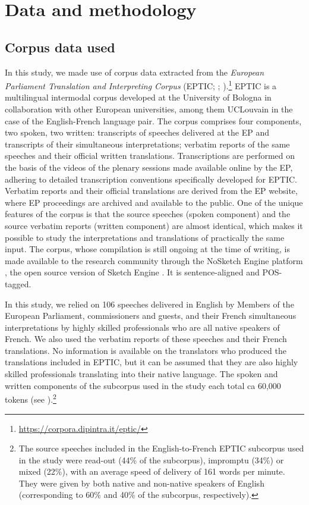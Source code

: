 \documentclass[output=paper]{langscibook}
\begin{document}
\section{Data and methodology}\label{sec:lefer:3}
\subsection{Corpus data used}\label{sec:lefer:3.1}

In this study, we made use of corpus data extracted from the \textit{European Parliament Translation and Interpreting Corpus} (EPTIC; \citealt{BernardiniEtAl2016}; \citealt{FerraresiBernardini2019}).\footnote{\url{https://corpora.dipintra.it/eptic/}} EPTIC is a multilingual intermodal corpus developed at the University of Bologna in collaboration with other European universities, among them UCLouvain in the case of the English-French language pair. The corpus comprises four components, two spoken, two written: transcripts of speeches delivered at the EP and transcripts of their simultaneous interpretations; verbatim reports of the same speeches and their official written translations. Transcriptions are performed on the basis of the videos of the plenary sessions made available online by the EP, adhering to detailed transcription conventions specifically developed for EPTIC. Verbatim reports and their official translations are derived from the EP website, where EP proceedings are archived and available to the public. One of the unique features of the corpus is that the source speeches (spoken component) and the source verbatim reports (written component) are almost identical, which makes it possible to study the interpretations and translations of practically the same input. The corpus, whose compilation is still ongoing at the time of writing, is made available to the research community through the NoSketch Engine platform \citep{Rychly2007}, the open source version of Sketch Engine \citep{KilgarriffEtAl2014}. It is sentence-aligned and POS-tagged.  

In this study, we relied on 106 speeches delivered in English by Members of the European Parliament, commissioners and guests, and their French simultaneous interpretations by highly skilled professionals who are all native speakers of French. We also used the verbatim reports of these speeches and their French translations. No information is available on the translators who produced the translations included in EPTIC, but it can be assumed that they are also highly skilled professionals translating into their native language. The spoken and written components of the subcorpus used in the study each total ca 60,000 tokens (see ).\footnote{The source speeches included in the English-to-French EPTIC subcorpus used in the study were read-out (44\% of the subcorpus), impromptu (34\%) or mixed (22\%), with an average speed of delivery of 161 words per minute. They were given by both native and non-native speakers of English (corresponding to 60\% and 40\% of the subcorpus, respectively).}
\end{document}
